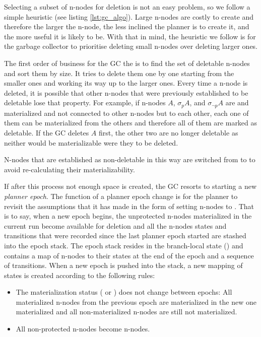 Selecting a subset of n-nodes for deletion is not an easy problem, so we follow a
simple heuristic (see listing \ref{lst:gc_algo}).
Large n-nodes are costly to create and therefore the larger the n-node,
the less inclined the planner is to create it, and the more useful it
is likely to be. With that in mind, the heuristic we follow is for the
garbage collector to prioritise deleting small n-nodes over deleting
larger ones.

The first order of business for the GC the is to find the set of
deletable n-nodes and sort them by size. It tries to delete them one by
one starting from the smaller ones and working its way up to the
larger ones. Every time a n-node is deleted, it is possible that other
n-nodes that were previously established to be deletable lose that
property. For example, if n-nodes \(A\), \(\sigma_p A\), and
\(\sigma_{\neg p} A\) are  and materialized and not
connected to other n-nodes but to each other, each one of
them can be materialized from the others and therefore all of them are
marked as deletable. If the GC deletes \(A\) first, the other
two are no longer deletable as neither would be materializable were they
to be deleted.

N-nodes that are established as non-deletable in this way are switched
from  to  to avoid re-calculating their
materializability.

If after this process not enough space is created, the GC resorts to
starting a new \emph{planner epoch}. The function of a planner epoch
change is for the planner to revisit the assumptions that it has made in
the form of setting n-nodes to . That is to say, when a new
epoch begins, the unprotected n-nodes materialized in the current run
become available for deletion and all the
n-nodes states and transitions that were recorded since the last planner
epoch started are stashed into the epoch stack. The epoch stack
resides in the branch-local state () and contains a map
of n-nodes to their states at the end of the epoch and a sequence of
transitions. When a new epoch is pushed into the stack, a new mapping
of states is created according to the following rules:

\begin{itemize}
\item The materialization status ( or ) does not change between epochs: All
  materialized n-nodes from the previous epoch are materialized in the
  new one materialized and all non-materialized n-nodes are still not
  materialized.
\item All non-protected  n-nodes become 
  n-nodes.
\end{itemize}

